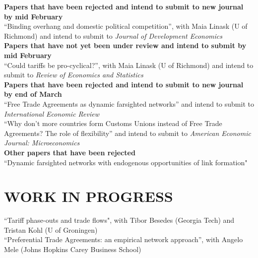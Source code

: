 \documentclass[11pt]{res}
\begin{document}
\begin{resume}
{\bf Papers that have been rejected and intend to submit to new journal by mid February}\vspace{1.5mm}\\
{``Binding overhang and domestic political competition''}, with Maia Linask (U of Richmond) and intend to submit to \emph{Journal of Development Economics}\vspace{1.5mm}\\
{\bf Papers that have not yet been under review and intend to submit by mid February}\vspace{1.5mm}\\
``Could tariffs be pro-cyclical?'', with Maia Linask (U of Richmond) and intend to submit to \emph{Review of Economics and Statistics}\vspace{1.5mm}\\
{\bf Papers that have been rejected and intend to submit to new journal by end of March}\vspace{1.5mm}\\
{ ``Free Trade Agreements as dynamic farsighted networks''} and intend to submit to \emph{International Economic Review}\vspace{1.5mm}\\
{``Why don't more countries form Customs Unions instead of Free Trade Agreements? The role of flexibility''} and intend to submit to \emph{American Economic Journal: Microeconomics}\vspace{1.5mm}\\
{\bf Other papers that have been rejected}\vspace{1.5mm}\\
{``Dynamic farsighted networks with endogenous opportunities of link formation"}\vspace{1.5mm}\\

\section{WORK IN PROGRESS}\vspace{2mm}
``Tariff phase-outs and trade flows", with Tibor Besedes (Georgia Tech) and Tristan Kohl (U of Groningen) \vspace{1.5mm}\\
``Preferential Trade Agreements: an empirical network approach'', with Angelo Mele (Johns Hopkins Carey Business School)\vspace{1.5mm}\\



\end{resume}
\end{document}

